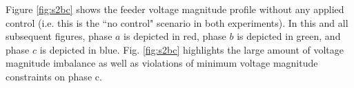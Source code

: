 Figure \ref{fig:s2bc} shows the feeder voltage magnitude profile without any applied control (i.e. this is the ``no control" scenario in both experiments). In this and all subsequent figures, phase $a$ is depicted in red, phase $b$ is depicted in green, and phase $c$ is depicted in blue. Fig. \ref{fig:s2bc} highlights the large amount of voltage magnitude imbalance as well as violations of minimum voltage magnitude constraints on phase c.


